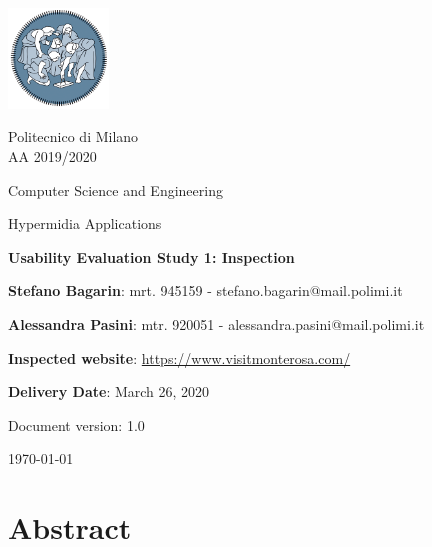 \documentclass[11pt, a4paperm, hidelinks]{article}
\begin{document}
	\begin{titlepage}
		\centering
		\includegraphics[width=0.20\textwidth]{./assets/polimi-logo.png}\par

		{Politecnico di Milano \\ AA 2019/2020} \par
		\vspace{1.5cm}

		{Computer Science and Engineering}\par
		\Large{Hypermidia Applications}\par
		\vspace{1.0cm}

		{\LARGE \textbf{Usability Evaluation Study 1: Inspection} \par}
		\vspace{1.5cm}

		{\normalsize {\textbf{Stefano Bagarin}: mrt. 945159 -  stefano.bagarin@mail.polimi.it }\par}
		\vspace{0.2cm}
		{\normalsize{\textbf{Alessandra Pasini}: mtr. 920051 - alessandra.pasini@mail.polimi.it}\par}
		\vspace{1.0cm}
		
		{\normalsize {\textbf{Inspected website}: \url{https://www.visitmonterosa.com/}}\par}
		\vspace{0.2cm}
		{\normalsize {\textbf{Delivery Date}: March 26, 2020}\par}
		\vfill

		{\large Document version: 1.0\par}
		{\large \today \par}
	\end{titlepage}

	\tableofcontents
	\clearpage


	\section{Abstract}
	
	\clearpage
\end{document}
